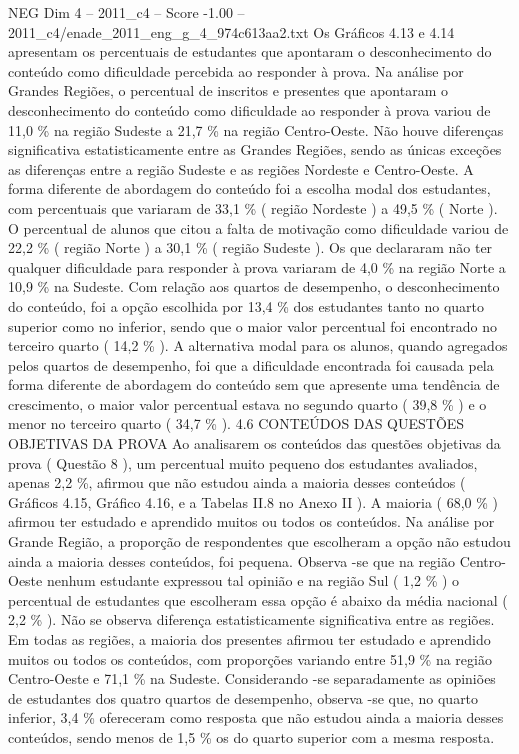 \begin{textsample}{NEG Dim 4 – 2011\_c4 – Score -1.00 – 2011\_c4/enade\_2011\_eng\_g\_4\_974c613aa2.txt}
Os Gráficos 4.13 e 4.14 apresentam os percentuais de estudantes que apontaram o desconhecimento do conteúdo como dificuldade percebida ao responder à prova.
Na análise por Grandes Regiões, o percentual de inscritos e presentes que apontaram o desconhecimento do conteúdo como dificuldade ao responder à prova variou de 11,0 \% na região Sudeste a 21,7 \% na região Centro-Oeste.
Não houve diferenças significativa estatisticamente entre as Grandes Regiões, sendo as únicas exceções as diferenças entre a região Sudeste e as regiões Nordeste e Centro-Oeste.
A forma diferente de abordagem do conteúdo foi a escolha modal dos estudantes, com percentuais que variaram de 33,1 \% ( região Nordeste ) a 49,5 \% ( Norte ).
O percentual de alunos que citou a falta de motivação como dificuldade variou de 22,2 \% ( região Norte ) a 30,1 \% ( região Sudeste ).
Os que declararam não ter qualquer dificuldade para responder à prova variaram de 4,0 \% na região Norte a 10,9 \% na Sudeste.
Com relação aos quartos de desempenho, o desconhecimento do conteúdo, foi a opção escolhida por 13,4 \% dos estudantes tanto no quarto superior como no inferior, sendo que o maior valor percentual foi encontrado no terceiro quarto ( 14,2 \% ).
A alternativa modal para os alunos, quando agregados pelos quartos de desempenho, foi que a dificuldade encontrada foi causada pela forma diferente de abordagem do conteúdo sem que apresente uma tendência de crescimento, o maior valor percentual estava no segundo quarto ( 39,8 \% ) e o menor no terceiro quarto ( 34,7 \% ). 4.6 CONTEÚDOS DAS QUESTÕES OBJETIVAS DA PROVA Ao analisarem os conteúdos das questões objetivas da prova ( Questão 8 ), um percentual muito pequeno dos estudantes avaliados, apenas 2,2 \%, afirmou que não estudou ainda a maioria desses conteúdos ( Gráficos 4.15, Gráfico 4.16, e a Tabelas II.8 no Anexo II ).
A maioria ( 68,0 \% ) afirmou ter estudado e aprendido muitos ou todos os conteúdos.
Na análise por Grande Região, a proporção de respondentes que escolheram a opção não estudou ainda a maioria desses conteúdos, foi pequena.
Observa -se que na região Centro-Oeste nenhum estudante expressou tal opinião e na região Sul ( 1,2 \% ) o percentual de estudantes que escolheram essa opção é abaixo da média nacional ( 2,2 \% ).
Não se observa diferença estatisticamente significativa entre as regiões.
Em todas as regiões, a maioria dos presentes afirmou ter estudado e aprendido muitos ou todos os conteúdos, com proporções variando entre 51,9 \% na região Centro-Oeste e 71,1 \% na Sudeste.
Considerando -se separadamente as opiniões de estudantes dos quatro quartos de desempenho, observa -se que, no quarto inferior, 3,4 \% ofereceram como resposta que não estudou ainda a maioria desses conteúdos, sendo menos de 1,5 \% os do quarto superior com a mesma resposta.

\end{textsample}
